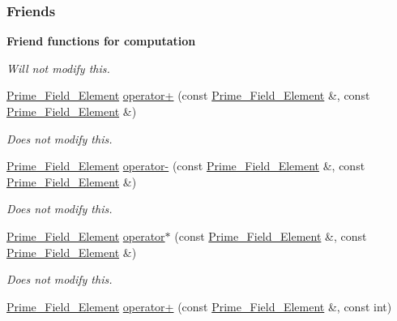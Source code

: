 \subsubsection*{Friends}
\begin{Indent}\textbf{ Friend functions for computation}\par
{\em Will not modify {\ttfamily this}. }\begin{DoxyCompactItemize}
\item 
\hyperlink{group___fields_group_class_prime___field___element}{Prime\+\_\+\+Field\+\_\+\+Element} \hyperlink{group___fields_group_af379d31756ccc09650e204aaa7dc1dd2}{operator+} (const \hyperlink{group___fields_group_class_prime___field___element}{Prime\+\_\+\+Field\+\_\+\+Element} \&, const \hyperlink{group___fields_group_class_prime___field___element}{Prime\+\_\+\+Field\+\_\+\+Element} \&)
\begin{DoxyCompactList}\small\item\em Does not modify {\ttfamily this}. \end{DoxyCompactList}\item 
\hyperlink{group___fields_group_class_prime___field___element}{Prime\+\_\+\+Field\+\_\+\+Element} \hyperlink{group___fields_group_aa87409f200d39343529ab443cd496b31}{operator-\/} (const \hyperlink{group___fields_group_class_prime___field___element}{Prime\+\_\+\+Field\+\_\+\+Element} \&, const \hyperlink{group___fields_group_class_prime___field___element}{Prime\+\_\+\+Field\+\_\+\+Element} \&)
\begin{DoxyCompactList}\small\item\em Does not modify {\ttfamily this}. \end{DoxyCompactList}\item 
\hyperlink{group___fields_group_class_prime___field___element}{Prime\+\_\+\+Field\+\_\+\+Element} \hyperlink{group___fields_group_a33507738ef00abb43ae64c900f7b807a}{operator$\ast$} (const \hyperlink{group___fields_group_class_prime___field___element}{Prime\+\_\+\+Field\+\_\+\+Element} \&, const \hyperlink{group___fields_group_class_prime___field___element}{Prime\+\_\+\+Field\+\_\+\+Element} \&)
\begin{DoxyCompactList}\small\item\em Does not modify {\ttfamily this}. \end{DoxyCompactList}\item 
\mbox{\label{group___fields_group_aeaa863df01035eb31f147cfe7194e8e1}} 
\hyperlink{group___fields_group_class_prime___field___element}{Prime\+\_\+\+Field\+\_\+\+Element} \hyperlink{group___fields_group_aeaa863df01035eb31f147cfe7194e8e1}{operator+} (const \hyperlink{group___fields_group_class_prime___field___element}{Prime\+\_\+\+Field\+\_\+\+Element} \&, const int)

\end{DoxyCompactItemize}
\end{Indent}
